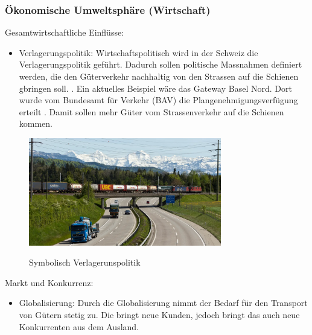 \documentclass{article}
\begin{document}
\subsubsection{Ökonomische Umweltsphäre (Wirtschaft)}
Gesamtwirtschaftliche Einflüsse:
\begin{itemize}
    \item Verlagerungspolitik:
    Wirtschaftspolitisch wird in der Schweiz die Verlagerungspolitik geführt.
    Dadurch sollen politische Massnahmen definiert werden, die den Güterverkehr nachhaltig von den Strassen auf die Schienen gbringen soll. \parencite[o. S.]{verlagerungspolitik}.
    Ein aktuelles Beispiel wäre das Gateway Basel Nord.
    Dort wurde vom Bundesamt für Verkehr (BAV) die Plangenehmigungsverfügung erteilt \parencite[o. S.]{gatewayBasel}.
    Damit sollen mehr Güter vom Strassenverkehr auf die Schienen kommen.
\end{itemize}
\begin{figure}[htbp] %
    \centering
    \includegraphics[width=0.75\textwidth]{Verlagerungspolitik} %
    \caption{Symbolisch Verlagerunspolitik}\parencite[o. S.]{verlagerungspolitikBild}
    \label{fig:bildlabel3}
\end{figure}
Markt und Konkurrenz:
\begin{itemize}
    \item Globalisierung:
    Durch die Globalisierung nimmt der Bedarf für den Transport von Gütern stetig zu.
    Die bringt neue Kunden, jedoch bringt das auch neue Konkurrenten aus dem Ausland. 
\end{itemize}
\end{document}

